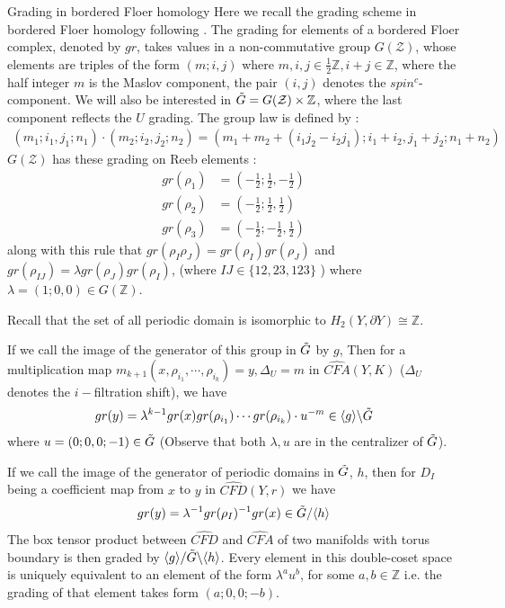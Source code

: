 \documentclass[11pt,reqno]{amsart}
\theoremstyle{definition}
\newtheorem *{remark}{Remark}
\newcommand{\cfahat}{\widehat{\mathit{CFA}}}
\newcommand{\cfdhat}{\widehat{\mathit{CFD}}}
\begin{document}
 \begin{subsection}{Grading in bordered Floer homology} 
 Here we recall the grading scheme in bordered Floer homology following \cite[Chapter 10]{lot08}.
The grading for elements of a bordered Floer complex, denoted by $gr$, takes values in a non-commutative group $G(\mathcal{Z})$, whose elements are triples of the form $(m;i,j)$ where $m,i,j \in \frac{1}{2}\mathbb{Z}, i+j \in \mathbb{Z} $, where the half integer $m$ is the Maslov component, the pair $(i,j)$ denotes the $spin^c$-component. We will also be interested in $\Tilde{G} = G(\mathcal{Z}) \times \mathbb{Z}$, where the last component reflects the $U$ grading. The group law is defined by : 
\begin{align*}
    (m_1;i_1,j_1;n_1) \cdot (m_2;i_2,j_2;n_2) = (m_1 + m_2 + (i_1j_2 -i_2j_1);i_1+i_2,j_1+j_2; n_1+n_2)
\end{align*}
$G(\mathcal{Z})$ has these grading on Reeb elements : 
\begin{align*}
    gr(\rho_1) &=  (-\frac{1}{2};\frac{1}{2},-\frac{1}{2}) \\
    gr(\rho_2) &= (-\frac{1}{2}; \frac{1}{2}, \frac{1}{2}) \\
    gr(\rho_3) &= (-\frac{1}{2}; -\frac{1}{2}, \frac{1}{2})
\end{align*}
along with this rule that $gr(\rho_I \rho_J) = gr(\rho_I)gr(\rho_J)$ and $gr(\rho_{IJ}) = \lambda gr(\rho_J) gr(\rho_I)$, (where $IJ \in \{12,23,123\}$ ) where $\lambda = (1;0,0) \in G(\mathbb{Z})$.

Recall that the set of all periodic domain is isomorphic to $H_2(Y,\partial Y) \cong \mathbb{Z}$. 

If we call the image of the generator of this group in $\Tilde{G}$ by $g$, Then for a multiplication map $m_{k+1}(x,\rho_{i_1},\cdots,\rho_{i_k}) = y, \Delta_U = m$ in $\cfahat(Y,K)$ ($\Delta_U$ denotes the $i-$filtration shift), we have 
\begin{align*}
    gr(y) = \lambda^{k-1} gr(x)gr(\rho_{i_1})\cdots gr(\rho_{i_k})\cdot u^{-m} \in \langle g \rangle \symbol{92} \Tilde{G}
\end{align*} 
where $u = (0;0,0;-1) \in \Tilde{G}$ (Observe that both $\lambda, u$ are in the centralizer of $\Tilde{G}$). 

If we call the image of the generator of periodic domains in $\Tilde{G}$, $h$, then for $D_{I}$ being a coefficient map from $x$ to $y$ in $\cfdhat(Y,r)$ we have \begin{align*}
    gr(y) = \lambda^{-1} gr(\rho_I)^{-1} gr(x) \in \Tilde{G} / \langle h \rangle
\end{align*}
The box tensor product between $\cfdhat$ and $\cfahat$ of two manifolds with torus boundary is then graded by $ \langle g \rangle / \Tilde{G} \symbol{92} \langle h \rangle$. Every element in this double-coset space is uniquely equivalent to an element of the form $\lambda^a u^b$, for some $a,b \in \mathbb{Z}$ i.e. the grading of that element takes form $(a;0,0;-b)$.


\end{subsection}
\end{document}
